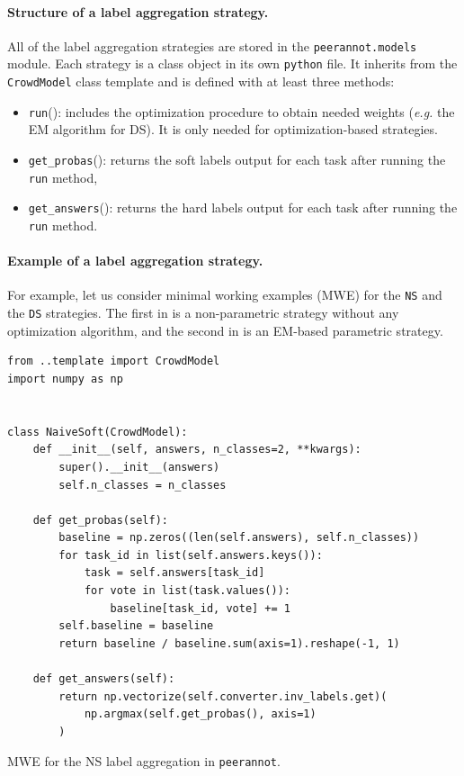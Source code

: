\paragraph{Structure of a label aggregation strategy.}

All of the label aggregation strategies are stored in the \texttt{peerannot.models} module.
Each strategy is a class object in its own \texttt{python} file.
It inherits from the \texttt{CrowdModel} class template and is defined with at least three methods:
\begin{itemize}
    \item \texttt{run}(): includes the optimization procedure to obtain needed weights (\emph{e.g.} the EM algorithm for DS). It is only needed for optimization-based strategies.
    \item \texttt{get\_probas}(): returns the soft labels output for each task after running the \texttt{run} method,
    \item \texttt{get\_answers}(): returns the hard labels output for each task after running the \texttt{run} method.
\end{itemize}

\paragraph{Example of a label aggregation strategy.}

For example, let us consider minimal working examples (MWE) for the \texttt{NS} and the \texttt{DS} strategies.
The first in  is a non-parametric strategy without any optimization algorithm, and the second in  is an EM-based parametric strategy.

\begin{listing}[!ht]
\begin{verbatim}
from ..template import CrowdModel
import numpy as np


class NaiveSoft(CrowdModel):
    def __init__(self, answers, n_classes=2, **kwargs):
        super().__init__(answers)
        self.n_classes = n_classes

    def get_probas(self):
        baseline = np.zeros((len(self.answers), self.n_classes))
        for task_id in list(self.answers.keys()):
            task = self.answers[task_id]
            for vote in list(task.values()):
                baseline[task_id, vote] += 1
        self.baseline = baseline
        return baseline / baseline.sum(axis=1).reshape(-1, 1)

    def get_answers(self):
        return np.vectorize(self.converter.inv_labels.get)(
            np.argmax(self.get_probas(), axis=1)
        )
\end{verbatim}
\caption{MWE for the NS label aggregation in \texttt{peerannot}.}
\label{listing:NS}
\end{listing}

